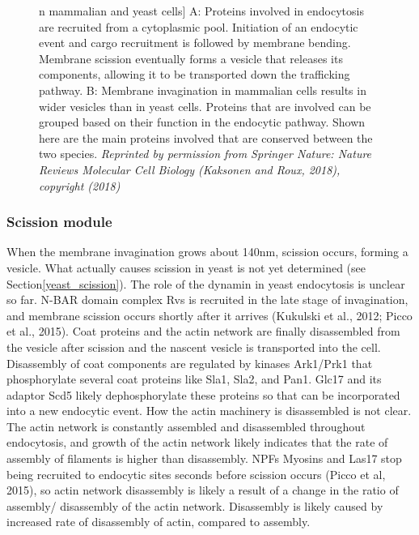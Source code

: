 \begin{figure}[H]
n mammalian and yeast cells]
	{A: Proteins involved in endocytosis are recruited from a cytoplasmic pool. Initiation of an endocytic event and cargo recruitment is followed by membrane bending. Membrane scission eventually forms a vesicle that releases its components, allowing it to be transported down the trafficking pathway. B: Membrane invagination in mammalian cells results in wider vesicles than in yeast cells. Proteins that are involved can be grouped based on their function in the endocytic pathway. Shown here are the main proteins involved that are conserved between the two species. 
		\textit{Reprinted by permission from Springer Nature: Nature Reviews Molecular Cell Biology (Kaksonen and Roux, 2018), copyright (2018)}
		\label{intro_endpathway}}
\end{figure}

\newpage
			\subsubsection{Scission module}
When the membrane invagination grows about 140nm, scission occurs, forming a vesicle. What actually causes scission in yeast is not yet determined (see Section\ref{yeast_scission}).
The role of the dynamin in yeast endocytosis is unclear so far. N-BAR domain complex Rvs is recruited in the late stage of invagination, and membrane scission occurs shortly after it arrives (Kukulski et al., 2012; Picco et al., 2015). 
\vspace{5mm}
Coat proteins and the actin network are finally disassembled from the vesicle after scission and the nascent vesicle is transported into the cell. Disassembly of coat components are regulated by kinases Ark1/Prk1 that phosphorylate several coat proteins like Sla1, Sla2, and Pan1. Glc17 and its adaptor Scd5 likely dephosphorylate these proteins so that can be incorporated into a new endocytic event. How the actin machinery is disassembled is not clear. The actin network is constantly assembled and disassembled throughout endocytosis, and growth of the actin network likely indicates that the rate of assembly of filaments is higher than disassembly. NPFs Myosins and Las17 stop being recruited to endocytic sites seconds before scission occurs (Picco et al, 2015), so actin network disassembly is likely a result of a change in the ratio of assembly/ disassembly of the actin network. Disassembly is likely caused by increased rate of disassembly of actin, compared to assembly. 





